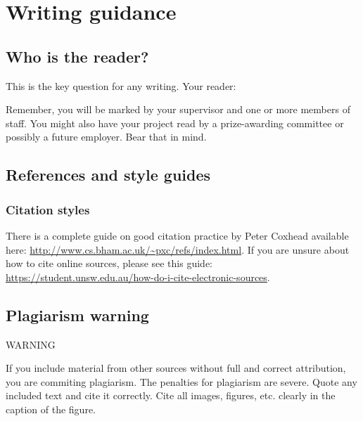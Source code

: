 \documentclass{l4proj}
\begin{document}
\section{Writing guidance}
\subsection{Who is the reader?}

This is the key question for any writing. Your reader:

Remember, you will be marked by your supervisor and one or more members
of staff. You might also have your project read by a prize-awarding
committee or possibly a future employer. Bear that in mind.

\subsection{References and style guides}

\subsubsection{Citation styles}


There is a complete guide on good citation practice by Peter Coxhead available here: \url{http://www.cs.bham.ac.uk/~pxc/refs/index.html}. 
If you are unsure about how to cite online sources, please see this guide: \url{https://student.unsw.edu.au/how-do-i-cite-electronic-sources}.

\subsection{Plagiarism warning}

\begin{highlight_title}{WARNING}
    
    If you include material from other sources without full and correct attribution, you are commiting plagiarism. The penalties for plagiarism are severe.
    Quote any included text and cite it correctly. Cite all images, figures, etc. clearly in the caption of the figure.
\end{highlight_title}
\end{document}
